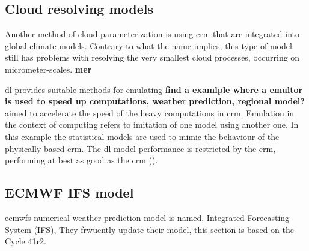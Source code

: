 \subsection{Cloud resolving models} \label{sec:params_climate_models}
Another method of cloud parameterization is using \acrfull{crm} that are integrated into global climate models. Contrary to what the name implies, this type of model still has problems with resolving the very smallest cloud processes, occurring on micrometer-scales. 
\textbf{mer}

\acrshort{dl} provides suitable methods for emulating \textbf{find a examlple where a emultor is used to speed up computations, weather prediction, regional model?} 
aimed to accelerate the speed of the heavy computations in \acrshort{crm}. Emulation in the context of computing refers to imitation of one model using another one. In this example the statistical models are used to mimic the behaviour of the physically based \acrshort{crm}. The \acrshort{dl} model performance is restricted by the  \acrshort{crm}, performing at best as good as the \acrshort{crm} (\cite{Rasp2018DeepModels}).

\subsection{ECMWF IFS model} \label{sec:era5_param}
\acrfull{ecmwf}s numerical weather prediction model is named, Integrated Forecasting System (IFS), They frwuently update their model, this section is based on the Cycle 41r2. 

